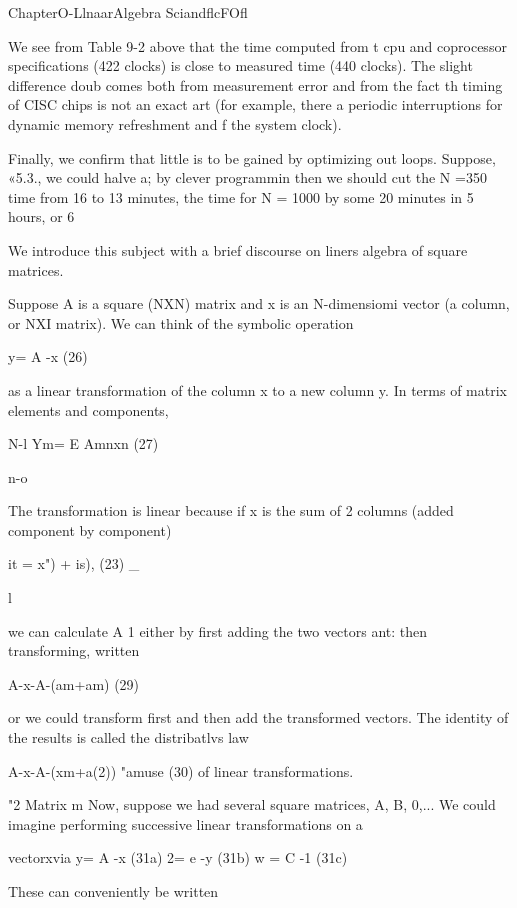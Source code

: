{  
 
    
   
   
  

ChapterO-LlnaarAlgebra SciandflcFOfl

We see from Table 9-2 above that the time computed from t
cpu and coprocessor specifications (422 clocks) is close to
measured time (440 clocks). The slight difference doub
comes both from measurement error and from the fact th
timing of CISC chips is not an exact art (for example, there a
periodic interruptions for dynamic memory refreshment and f
the system clock).

Finally, we confirm that little is to be gained by optimizing out
loops. Suppose, «5.3., we could halve a; by clever programmin
then we should cut the N =350 time from 16 to 13 minutes,
the time for N = 1000 by some 20 minutes in 5 hours, or 6%

We introduce this subject with a brief discourse on liners
algebra of square matrices.

Suppose A is a square (NXN) matrix and x is an N-dimensiomi
vector (a column, or NXI matrix). We can think of the symbolic
operation

y= A -x (26)

 

as a linear transformation of the column x to a new column y. In
terms of matrix elements and components,

N-l
Ym= E Amnxn (27)

n-o

The transformation is linear because if x is the sum of 2 columns
(added component by component)

it = x") + is), (23) \_

l

we can calculate A 1 either by first adding the two vectors ant:
then transforming, written

A-x-A-(am+am) (29)

or we could transform first and then add the transformed vectors.
The identity of the results is called the distribatlvs law

A-x-A-(xm+a(2)) "amuse (30)
of linear transformations.

"2 Matrix m
Now, suppose we had several square matrices, A, B, 0,... We
could imagine performing successive linear transformations on a

vectorxvia
y= A -x (31a)
2= e -y (31b)
w = C -1 (31c)

These can conveniently be written

}
